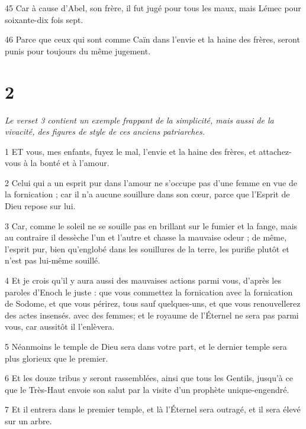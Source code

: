 \par 45 Car à cause d'Abel, son frère, il fut jugé pour tous les maux, mais Lémec pour soixante-dix fois sept.

\par 46 Parce que ceux qui sont comme Caïn dans l'envie et la haine des frères, seront punis pour toujours du même jugement.

\chapter{2}

\par \textit{Le verset 3 contient un exemple frappant de la simplicité, mais aussi de la vivacité, des figures de style de ces anciens patriarches.}

\par 1 ET vous, mes enfants, fuyez le mal, l'envie et la haine des frères, et attachez-vous à la bonté et à l'amour.

\par 2 Celui qui a un esprit pur dans l'amour ne s'occupe pas d'une femme en vue de la fornication ; car il n'a aucune souillure dans son cœur, parce que l'Esprit de Dieu repose sur lui.

\par 3 Car, comme le soleil ne se souille pas en brillant sur le fumier et la fange, mais au contraire il dessèche l'un et l'autre et chasse la mauvaise odeur ; de même, l'esprit pur, bien qu'englobé dans les souillures de la terre, les purifie plutôt et n'est pas lui-même souillé.

\par 4 Et je crois qu'il y aura aussi des mauvaises actions parmi vous, d'après les paroles d'Enoch le juste : que vous commettez la fornication avec la fornication de Sodome, et que vous périrez, tous sauf quelques-uns, et que vous renouvellerez des actes insensés. avec des femmes; et le royaume de l'Éternel ne sera pas parmi vous, car aussitôt il l'enlèvera.

\par 5 Néanmoins le temple de Dieu sera dans votre part, et le dernier temple sera plus glorieux que le premier.

\par 6 Et les douze tribus y seront rassemblées, ainsi que tous les Gentils, jusqu'à ce que le Très-Haut envoie son salut par la visite d'un prophète unique-engendré.

\par 7 Et il entrera dans le premier temple, et là l'Éternel sera outragé, et il sera élevé sur un arbre.

